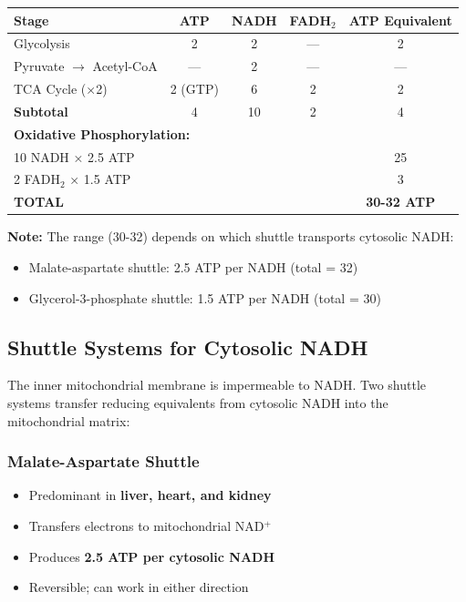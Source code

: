 \begin{center}
\begin{tcolorbox}[colback=green!5, colframe=green!70!black, title=\textbf{Complete ATP Accounting per Glucose}]
\begin{tabular}{lcccc}
\toprule
\textbf{Stage} & \textbf{ATP} & \textbf{NADH} & \textbf{FADH$_2$} & \textbf{ATP Equivalent} \\
\midrule
Glycolysis & 2 & 2 & — & 2 \\
Pyruvate $\rightarrow$ Acetyl-CoA & — & 2 & — & — \\
TCA Cycle (×2) & 2 (GTP) & 6 & 2 & 2 \\
\midrule
\textbf{Subtotal} & 4 & 10 & 2 & 4 \\
\midrule
\multicolumn{5}{l}{\textbf{Oxidative Phosphorylation:}} \\
10 NADH × 2.5 ATP & & & & 25 \\
2 FADH$_2$ × 1.5 ATP & & & & 3 \\
\midrule
\textbf{TOTAL} & & & & \textbf{30-32 ATP} \\
\bottomrule
\end{tabular}

\vspace{0.3cm}
\textbf{Note:} The range (30-32) depends on which shuttle transports cytosolic NADH:
\begin{itemize}
    \item Malate-aspartate shuttle: 2.5 ATP per NADH (total = 32)
    \item Glycerol-3-phosphate shuttle: 1.5 ATP per NADH (total = 30)
\end{itemize}
\end{tcolorbox}
\end{center}

\subsection{Shuttle Systems for Cytosolic NADH}

The inner mitochondrial membrane is impermeable to NADH. Two shuttle systems transfer reducing equivalents from cytosolic NADH into the mitochondrial matrix:

\subsubsection{Malate-Aspartate Shuttle}

\begin{itemize}
    \item Predominant in \textbf{liver, heart, and kidney}
    \item Transfers electrons to mitochondrial NAD$^+$
    \item Produces \textbf{2.5 ATP per cytosolic NADH}
    \item Reversible; can work in either direction
\end{itemize}

